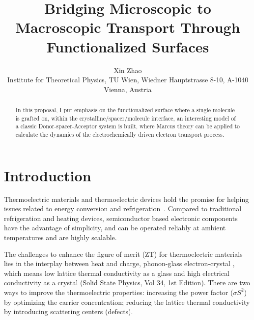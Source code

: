 \documentclass[prb,showpacs,10pt,superscriptaddress]{revtex4-1}
\begin{document}
\title{Bridging Microscopic to Macroscopic Transport Through Functionalized Surfaces}
\author{Xin Zhao
\\Institute for Theoretical Physics, TU Wien, Wiedner Hauptstrasse 8-10, A-1040 Vienna, Austria}
\begin{abstract}
In this proposal, I put emphasis on the functionalized surface where a single molecule is grafted on, within the crystalline/spacer/molecule interface, an interesting model of a classic Donor-spacer-Acceptor system is built, where Marcus theory can be applied to calculate the dynamics of the electrochemically driven electron transport process. 
\end{abstract}
\maketitle

\section{Introduction}
Thermoelectric materials and thermoelectric devices hold the promise for helping issues related to energy conversion and refrigeration~\cite{A review on thermoelectric renewable energy}. Compared to traditional refrigeration and heating devices, semiconductor based electronic components have the advantage of simplicity, and can be operated reliably at ambient temperatures and are highly scalable.

The challenges to enhance the figure of merit (ZT) for thermoelectric materials lies in the interplay between heat and charge, \textacutedbl phonon-glass electron-crystal \textgravedbl, which means low lattice thermal conductivity as a glass and high electrical conductivity as a crystal (Solid State Physics, Vol 34, 1st Edition). There are two ways to improve the thermoelectric properties: increasing the power factor ($\sigma S^2$) by optimizing the carrier concentration; reducing the lattice thermal conductivity by introducing scattering centers (defects).  
\end{document}
